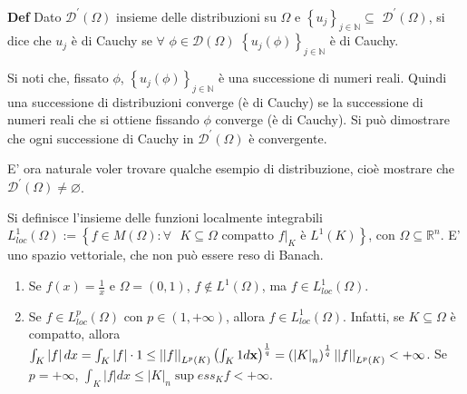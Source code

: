 \documentclass{article}
\begin{document}
\textbf{Def} Dato $\mathcal{D}^{\prime }\left( \Omega \right) $ insieme
delle distribuzioni su $\Omega $ e $\left\{ u_{j}\right\} _{j\in 
\mathbb{N}
}\subseteq $ $\mathcal{D}^{\prime }\left( \Omega \right) $, si dice che $%
u_{j}$ \`{e} di Cauchy se $\forall $ $\phi \in \mathcal{D}\left( \Omega
\right) $ $\left\{ u_{j}\left( \phi \right) \right\} _{j\in 
\mathbb{N}
}$ \`{e} di Cauchy.

Si noti che, fissato $\phi $, $\left\{ u_{j}\left( \phi \right) \right\}
_{j\in 
\mathbb{N}
}$ \`{e} una successione di numeri reali. Quindi una successione di
distribuzioni converge (\`{e} di Cauchy) se la successione di numeri reali
che si ottiene fissando $\phi $ converge (\`{e} di Cauchy). Si pu\`{o}
dimostrare che ogni successione di Cauchy in $\mathcal{D}^{\prime }\left(
\Omega \right) $ \`{e} convergente.

E' ora naturale voler trovare qualche esempio di distribuzione, cio\`{e}
mostrare che $\mathcal{D}^{\prime }\left( \Omega \right) \neq \varnothing $.

Si definisce l'insieme delle funzioni localmente integrabili $%
L_{loc}^{1}\left( \Omega \right) :=\left\{ f\in M\left( \Omega \right)
:\forall \text{ }K\subseteq \Omega \text{ compatto }f|_{K}\text{ \`{e} }%
L^{1}\left( K\right) \right\} $, con $\Omega \subseteq 
\mathbb{R}
^{n}$. E' uno spazio vettoriale, che non pu\`{o} essere reso di Banach.

\begin{enumerate}
\item Se $f\left( x\right) =\frac{1}{x}$ e $\Omega =\left( 0,1\right) $, $%
f\not\in L^{1}\left( \Omega \right) $, ma $f\in L_{loc}^{1}\left( \Omega
\right) $.

\item Se $f\in L_{loc}^{p}\left( \Omega \right) $ con $p\in \left( 1,+\infty
\right) $, allora $f\in L_{loc}^{1}\left( \Omega \right) $. Infatti, se $%
K\subseteq \Omega $ \`{e} compatto, allora $\int_{K}\left\vert f\right\vert
dx=\int_{K}\left\vert f\right\vert \cdot 1\leq \left\vert \left\vert
f\right\vert \right\vert _{L^{p}\left( K\right) }\left( \int_{K}1d\mathbf{x}%
\right) ^{\frac{1}{q}}=\left( \left\vert K\right\vert _{n}\right) ^{\frac{1}{%
q}}\left\vert \left\vert f\right\vert \right\vert _{L^{p}\left( K\right)
}<+\infty $. Se $p=+\infty $, $\int_{K}\left\vert f\right\vert dx\leq
\left\vert K\right\vert _{n}\sup ess_{K}f<+\infty $.
\end{enumerate}
\end{document}
